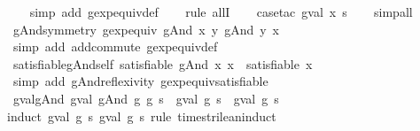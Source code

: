 \begin{isabellebody}
%
\isadelimproof
\ \ %
\endisadelimproof
%
\isatagproof
{}\isamarkupfalse%
\ {\isacharparenleft}simp\ add{\isacharcolon}\ gexp{\isacharunderscore}equiv{\isacharunderscore}def{\isacharparenright}\isanewline
\ \ \isamarkupfalse%
\ {\isacharparenleft}rule\ allI{\isacharparenright}\isanewline
\ \ \isamarkupfalse%
\ {\isacharparenleft}case{\isacharunderscore}tac\ {\isachardoublequoteopen}gval\ x\ s{\isachardoublequoteclose}{\isacharparenright}\isanewline
\ \ \isamarkupfalse%
\ simp{\isacharunderscore}all%
\endisatagproof
{\isafoldproof}%
%
\isadelimproof
\isanewline
%
\endisadelimproof
\isanewline
{}\isamarkupfalse%
\ gAnd{\isacharunderscore}symmetry{\isacharcolon}\ {\isachardoublequoteopen}gexp{\isacharunderscore}equiv\ {\isacharparenleft}gAnd\ x\ y{\isacharparenright}\ {\isacharparenleft}gAnd\ y\ x{\isacharparenright}{\isachardoublequoteclose}\isanewline
%
\isadelimproof
\ \ %
\endisadelimproof
%
\isatagproof
{}\isamarkupfalse%
\ {\isacharparenleft}simp\ add{\isacharcolon}\ add{\isachardot}commute\ gexp{\isacharunderscore}equiv{\isacharunderscore}def{\isacharparenright}%
\endisatagproof
{\isafoldproof}%
%
\isadelimproof
\isanewline
%
\endisadelimproof
\isanewline
{}\isamarkupfalse%
\ satisfiable{\isacharunderscore}gAnd{\isacharunderscore}self{\isacharcolon}\ {\isachardoublequoteopen}satisfiable\ {\isacharparenleft}gAnd\ x\ x{\isacharparenright}\ {\isacharequal}\ satisfiable\ x{\isachardoublequoteclose}\isanewline
%
\isadelimproof
\ \ %
\endisadelimproof
%
\isatagproof
{}\isamarkupfalse%
\ {\isacharparenleft}simp\ add{\isacharcolon}\ gAnd{\isacharunderscore}reflexivity\ gexp{\isacharunderscore}equiv{\isacharunderscore}satisfiable{\isacharparenright}%
\endisatagproof
{\isafoldproof}%
%
\isadelimproof
\isanewline
%
\endisadelimproof
\isanewline
{}\isamarkupfalse%
\ gval{\isacharunderscore}gAnd{\isacharcolon}\ {\isachardoublequoteopen}gval\ {\isacharparenleft}gAnd\ g{}\ g{}{\isacharparenright}\ s\ {\isacharequal}\ {\isacharparenleft}gval\ g{}\ s{\isacharparenright}\ {\isasymand}\isactrlsub {\isacharquery}\ {\isacharparenleft}gval\ g{}\ s{\isacharparenright}{\isachardoublequoteclose}\isanewline
%
\isadelimproof
%
\endisadelimproof
%
\isatagproof
{}\isamarkupfalse%
{\isacharparenleft}induct\ {\isachardoublequoteopen}gval\ g{}\ s{\isachardoublequoteclose}\ {\isachardoublequoteopen}gval\ g{}\ s{\isachardoublequoteclose}\ rule{\isacharcolon}\ times{\isacharunderscore}trilean{\isachardot}induct{\isacharparenright}\isanewline

\end{isabellebody}
